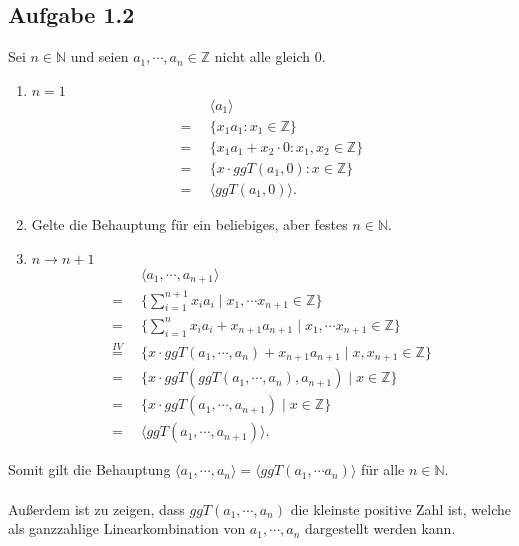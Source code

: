 \documentclass[12pt]{article}
\begin{document}
\subsection*{Aufgabe 1.2}
Sei $n \in \mathbb{N}$ und seien $a_1, \cdots, a_n \in \mathbb{Z}$ nicht alle gleich $0$.
\begin{enumerate}
	\item[\framebox{\textbf{IA}}] \underline{$n = 1$}
	\begin{align*}
		&\langle a_1 \rangle \\
		= \enspace &\{x_1 a_1 : x_1 \in \mathbb{Z}\} \\
		= \enspace &\{x_1 a_1 + x_2 \cdot 0 : x_1, x_2 \in \mathbb{Z}\} \\
		= \enspace &\{x \cdot ggT(a_1, 0) : x \in \mathbb{Z}\} \\
		= \enspace &\langle ggT(a_1, 0) \rangle.
	\end{align*}
	
	\item[\framebox{\textbf{IV}}] Gelte die Behauptung für ein beliebiges, aber festes $n \in \mathbb{N}$.
	
	\item[\framebox{\textbf{IS}}] \underline{$n \rightarrow n + 1$}
	\begin{align*}
		&\langle a_1, \cdots, a_{n+1} \rangle \\
		= \enspace &\{\sum_{i=1}^{n+1}x_i a_i \mid x_1, \cdots x_{n+1} \in \mathbb{Z}\} \\
		= \enspace &\{\sum_{i=1}^{n}x_i a_i + x_{n+1} a_{n+1} \mid x_1, \cdots x_{n+1} \in \mathbb{Z}\} \\
		\overset{IV}{=}  \enspace &\{x \cdot ggT(a_1, \cdots, a_n) + x_{n+1} a_{n+1} \mid x, x_{n+1} \in \mathbb{Z}\} \\
		= \enspace &\{x \cdot ggT(ggT(a_1, \cdots, a_n), a_{n+1}) \mid x \in \mathbb{Z}\} \\
		= \enspace &\{x \cdot ggT(a_1, \cdots, a_{n+1}) \mid x \in \mathbb{Z}\} \\
		= \enspace &\langle ggT(a_1, \cdots, a_{n+1}) \rangle.
	\end{align*}
\end{enumerate}
Somit gilt die Behauptung $\langle a_1, \cdots, a_n \rangle = \langle ggT(a_1, \cdots a_n) \rangle$ für alle $n \in \mathbb{N}$. \\\\
Außerdem ist zu zeigen, dass $ggT(a_1, \cdots, a_n)$ die kleinste positive Zahl ist, welche als ganzzahlige Linearkombination von $a_1, \cdots, a_n$ dargestellt werden kann. \\\\
\end{document}
